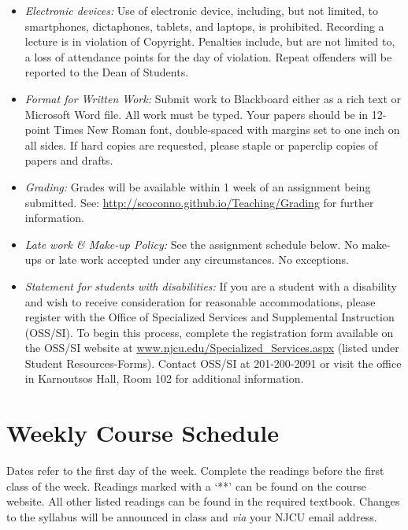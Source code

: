 \documentclass[article,oneside]{memoir}
\begin{document}
\begin{itemize}
\item \textit{Electronic devices:} Use of electronic device, including, but not limited, to smartphones, dictaphones, tablets, and laptops, is prohibited. Recording a lecture is in violation of Copyright. Penalties include, but are not limited to, a loss of attendance points for the day of violation. Repeat offenders will be reported to the Dean of Students.

\item \textit{Format for Written Work:} Submit work to Blackboard either as a rich text or Microsoft Word file. All work must be typed. Your papers should be in 12-point Times New Roman font, double-spaced with margins set to one inch on all sides. If hard copies are requested, please staple or paperclip copies of papers and drafts.



\item \textit{Grading:} Grades will be available within 1 week of an assignment being submitted. See: \href{http://scoconno.github.io/Teaching/Grading}{http://scoconno.github.io/Teaching/Grading} for further information.


\item \textit{Late work \& Make-up Policy:} See the assignment schedule below. No make-ups or late work accepted under any circumstances. No exceptions.


\item \textit{Statement for students with disabilities:} If you are a student with a disability and wish to receive consideration for reasonable accommodations, please register with the Office of Specialized Services and Supplemental Instruction (OSS/SI). To begin this process, complete the registration form available on the OSS/SI website at
\href{http://www.njcu.edu/Specialized_Services.aspx}{www.njcu.edu/Specialized\_Services.aspx}
(listed under Student Resources-Forms). Contact OSS/SI at 201-200-2091
or visit the office in Karnoutsos Hall, Room 102 for additional
information.

\end{itemize}



\section{Weekly Course Schedule}
Dates refer to the first day of the week. Complete the readings before the first class of the week. Readings marked with a `**' can be found on the course website. All other listed readings can be found in the required textbook. Changes to the syllabus will be announced in class and \emph{via} your NJCU email address.
\end{document}
